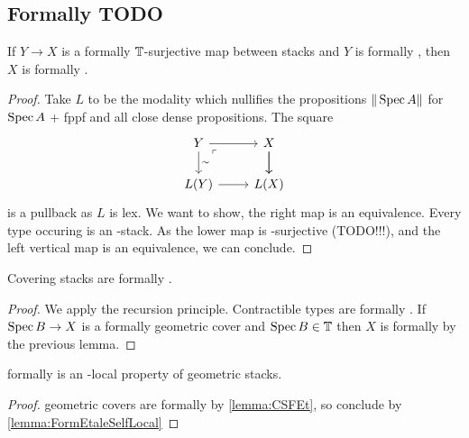 \subsection{Formally \etale TODO}
\begin{lemma}[TODO]{\label{lemma:FormEtaleSelfLocal}}
	If $Y \to X$ is a formally \etale $\mathbb{T}$-surjective map between stacks and $Y$ is formally \etale, then $X$ is formally \etale.
\end{lemma}
\begin{proof}
	Take $L$ to be the modality which nullifies the propositions $\|\operatorname{Spec} A\|$ for $\operatorname{Spec} A$ \etale + fppf and all close dense propositions.
	The square 
	\[\begin{tikzcd}
		{Y} & {X} \\
		{L(Y)} & {L(X)}
		\arrow[from=1-1, to=1-2]
		\arrow["\sim", from=1-1, to=2-1]
		\arrow["\ulcorner"{anchor=center, pos=0.125}, draw=none, from=1-1, to=2-2]
		\arrow[from=1-2, to=2-2]
		\arrow[from=1-2, to=2-2]
		\arrow[from=2-1, to=2-2]
	\end{tikzcd}\]
	is a pullback as $L$ is lex. 
	We want to show, the right map is an equivalence. 
	Every type occuring is an \etale-stack.
	As the lower map is \etale-surjective (TODO!!!), and the left vertical map is an equivalence, we can conclude.
\end{proof}
\begin{lemma}{\label{lemma:CSFEt}}
	Covering stacks are formally \etale.	
\end{lemma}
\begin{proof}
	We apply the recursion principle. Contractible types are formally \etale.
	If $\operatorname{Spec} B \to X$ is a formally \etale geometric cover  and $\operatorname{Spec} B \in \mathbb{T}$  then $X$ is formally \etale by the previous lemma. %
	
\end{proof}
\begin{lemma}{\label{lemma:FEtLocal}}
	formally \etale is an \etale-local property of geometric stacks.	
\end{lemma}
\begin{proof}
	geometric covers are formally \etale  by \ref{lemma:CSFEt}, so conclude by \ref{lemma:FormEtaleSelfLocal}
\end{proof}